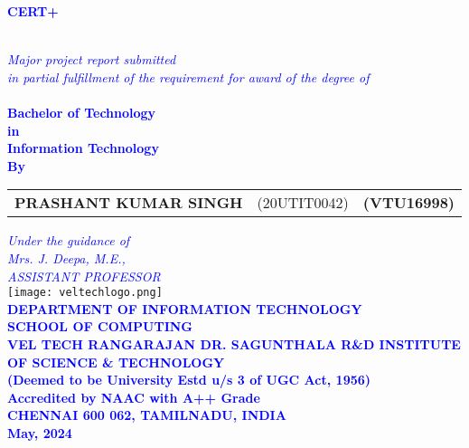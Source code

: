 \documentclass[10pt]{report}
\begin{document}
\newpage
\begin{center}
\thispagestyle{empty}
\LARGE{\textsc {\textbf{\textcolor{blue}{CERT+}}}}\\[0.2cm]
\vspace{0.2cm}

\Large{\textit{\textcolor{blue}{\\Major project report submitted \\in partial fulfillment of the
requirement
for award of the degree of}}}\\[0.3cm]
\Large{\textbf{\textcolor{blue}{\\Bachelor of Technology\\in \\Information Technology}}}
\vspace{0.5cm}
\Large{\textbf{\textcolor{blue}{\\By}}}\\[0.5cm]
\begin{table}[h]
\centering
\Large{\textcolor{blue}{
\begin{tabular}{>{\bfseries}lc>{\bfseries}r}
PRASHANT KUMAR SINGH &(20UTIT0042) & (VTU16998)\\
\end{tabular}}}
\end{table}
\vspace{0.5cm}
\large{\textit{\textcolor{blue}{Under the guidance of}}}\\
\large{\textit{\textcolor{blue}{Mrs. J. Deepa, M.E.,\\
ASSISTANT PROFESSOR}
}}\\
\vspace{0.5cm}
\texttt{[image: veltechlogo.png]}\\
\vspace{1cm}
\large{\textbf{\textcolor{blue}{DEPARTMENT OF INFORMATION TECHNOLOGY}}}\\

\large{\textbf{\textcolor{blue}{SCHOOL OF COMPUTING}}}\\
\vspace{0.5cm}
\Large{\textbf{\textcolor{blue}{VEL TECH RANGARAJAN DR. SAGUNTHALA R\&D INSTITUTE OF
SCIENCE \& TECHNOLOGY\\
\vspace{0.2cm}
(Deemed to be University Estd u/s 3 of UGC Act,
1956)}}}\\\Large{\textbf{\textcolor{blue}{Accredited by NAAC with A++ Grade}}}\\

\large{\textbf{\textcolor{blue}{CHENNAI 600 062, TAMILNADU, INDIA}}}
\vspace{0.4cm}
\large{\textbf{\textcolor{blue}{\\May, 2024}}}\\
\end{center}
\end{document}
